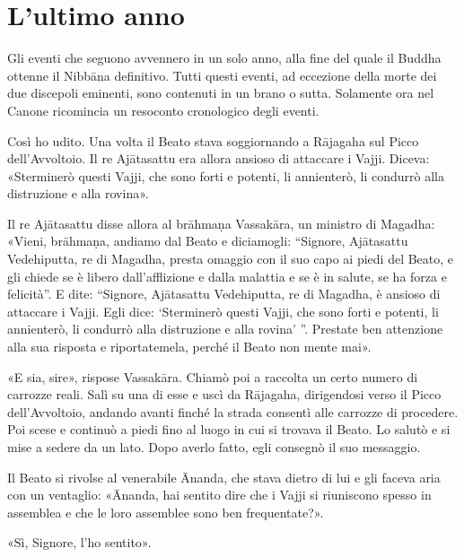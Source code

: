 \chapter{L'ultimo anno}

 Gli eventi che seguono avvennero in un solo anno,
alla fine del quale il Buddha ottenne il Nibbāna definitivo. Tutti questi
eventi, ad eccezione della morte dei due discepoli eminenti, sono contenuti in
un brano o sutta. Solamente ora nel Canone ricomincia un resoconto cronologico
degli eventi.

 Così ho udito. Una volta il Beato stava soggiornando a
Rājagaha sul Picco dell’Avvoltoio. Il re Ajātasattu era allora ansioso di
attaccare i Vajji. Diceva: «Sterminerò questi Vajji, che sono forti e potenti,
li annienterò, li condurrò alla distruzione e alla rovina».

Il re Ajātasattu disse allora al brāhmaṇa Vassakāra, un ministro di Magadha:
«Vieni, brāhmaṇa, andiamo dal Beato e diciamogli: “Signore, Ajātasattu
Vedehiputta, re di Magadha, presta omaggio con il suo capo ai piedi del Beato, e
gli chiede se è libero dall’afflizione e dalla malattia e se è in salute, se ha
forza e felicità”. E dite: “Signore, Ajātasattu Vedehiputta, re di Magadha, è
ansioso di attaccare i Vajji. Egli dice: ‘Sterminerò questi Vajji, che sono
forti e potenti, li annienterò, li condurrò alla distruzione e alla rovina’ ”.
Prestate ben attenzione alla sua risposta e riportatemela, perché il Beato non
mente mai».

«E sia, sire», rispose Vassakāra. Chiamò poi a raccolta un certo numero di
carrozze reali. Salì su una di esse e uscì da Rājagaha, dirigendosi verso il
Picco dell’Avvoltoio, andando avanti finché la strada consentì alle carrozze di
procedere. Poi scese e continuò a piedi fino al luogo in cui si trovava il
Beato. Lo salutò e si mise a sedere da un lato. Dopo averlo fatto, egli consegnò
il suo messaggio.

Il Beato si rivolse al venerabile Ānanda, che stava dietro di lui e gli faceva
aria con un ventaglio: «Ānanda, hai sentito dire che i Vajji si riuniscono
spesso in assemblea e che le loro assemblee sono ben frequentate?».

«Sì, Signore, l’ho sentito».

